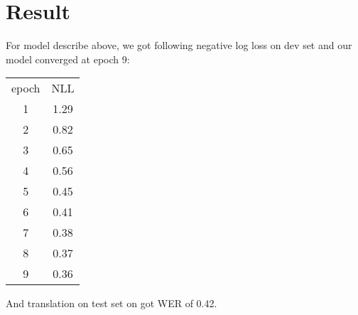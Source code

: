 \documentclass[11pt]{article}
\begin{document}
\section{Result}
For model describe above, we got following negative log loss on dev set and our model converged at epoch 9:
\begin{center}
\begin{tabular}{ c c }
 epoch & NLL\\
 1 & 1.29\\  
 2 & 0.82\\
 3 & 0.65\\
 4 & 0.56\\ 
 5 & 0.45\\
 6 & 0.41\\
 7 & 0.38\\
 8 & 0.37\\
 9 & 0.36\\
\end{tabular}
\end{center}
And translation on test set on got WER of 0.42.
\end{document}

